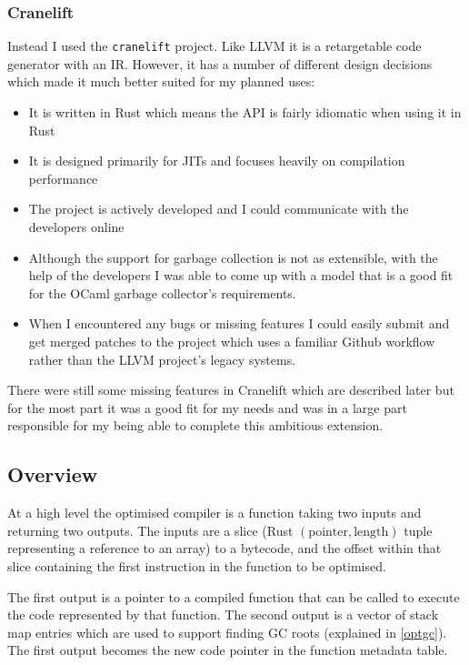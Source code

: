 \subsubsection{Cranelift}

Instead I used the \texttt{cranelift} project. Like LLVM it is a retargetable code generator with
an IR. However, it has a number of different design decisions which made it much better suited for
my planned uses:

\begin{itemize}
      \item It is written in Rust which means the API is fairly idiomatic when using it in Rust
      \item It is designed primarily for JITs and focuses heavily on compilation performance
      \item The project is actively developed and I could communicate with the developers online
      \item Although the support for garbage collection is not as extensible, with the help of the
            developers I was able to come up with a model that is a good fit for the OCaml garbage
            collector's
            requirements.
      \item When I encountered any bugs or missing features I could easily submit and get merged
            patches to the project which uses a familiar Github workflow rather than the LLVM
            project's legacy
            systems.
\end{itemize}

There were still some missing features in Cranelift which are described later but for the most
part it was a good fit for my needs and was in a large part responsible for my being able to
complete this ambitious extension.

\subsection{Overview}

At a high level the optimised compiler is a function taking two inputs and returning two outputs.
The inputs are a slice (Rust $(\text{pointer}, \text{length})$ tuple representing a reference to an
array) to a bytecode, and the offset within that slice containing the first instruction in the
function to be optimised.

The first output is a pointer to a compiled function that can be called to execute the code
represented by that function. The second output is a vector of stack map entries which are used
to support finding GC roots (explained in \ref{optgc}). The first output becomes the new code
pointer in the function metadata table.

